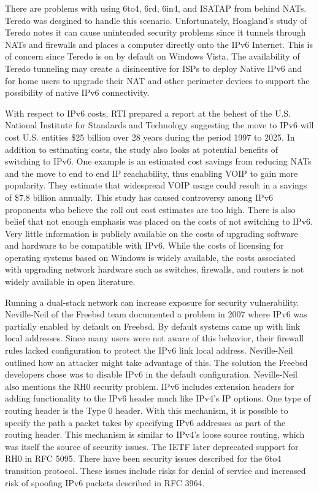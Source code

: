 There are problems with using 6to4, 6rd, 6in4, and ISATAP from behind
NATs.  Teredo was desgined to handle this scenario.  Unfortunately,
Hoagland's study of Teredo notes it can cause unintended security
problems since it tunnels through NATs and firewalls and places
a computer directly onto the IPv6 Internet.  This is of concern
since Teredo is on by default on Windows Vista.
The availability of Teredo tunneling may
create a disincentive for ISPs to deploy Native IPv6 and for home
users to upgrade their NAT and other perimeter devices to support
the possibility of native IPv6 connectivity.

With respect to IPv6 costs, RTI prepared a report at the behest of
the U.S. National Institute for Standards and Technology suggesting
the move to IPv6 will cost U.S. entities \$25 billion over 28
years during the period 1997 to 2025\cite{RTI01}.  In addition
to estimating costs, the study also looks at potential benefits
of switching to IPv6.  One example is an estimated cost savings
from reducing NATs and the move to end to end IP reachability,
thus enabling VOIP to gain more popularity.  They estimate that
widespread VOIP usage could result in a savings of \$7.8 billion
annually.  This study has caused controversy among IPv6 proponents
who believe the roll out cost estimates are too high.
There is also belief that not enough emphasis was placed on the
costs of not switching to IPv6.  Very little information is publicly
available on the costs of upgrading software and hardware to be
compatible with IPv6.  While the costs of licensing for operating
systems based on Windows is widely available, the costs associated
with upgrading network hardware such as switches, firewalls, and
routers is not widely available in open literature.

Running a dual-stack network can increase exposure for security
vulnerability.  Neville-Neil of the Freebsd team documented a problem
in 2007 where IPv6 was partially enabled by default on Freebsd.
By default systems came up with link local addresses.  Since many
users were not aware of this behavior, their firewall rules lacked
configuration to protect the IPv6 link local address\cite{Freebsd01}.
Neville-Neil outlined how an attacker might take advantage of this.
The solution the Freebsd developers chose was to disable IPv6
in the default configuration.  Neville-Neil also mentions the
RH0 security problem.  IPv6 includes extension headers for adding
functionality to the IPv6 header much like IPv4's IP options.  One
type of routing header is the Type 0 header.  With this mechanism,
it is possible to specify the path a packet takes by specifying
IPv6 addresses as part of the routing header.  This mechanism is
similar to IPv4's loose source routing, which was itself the source
of security issues\cite{RH01}.  The IETF later deprecated support
for RH0 in RFC 5095.  There have been security issues described for
the 6to4 transition protocol.  These issues include risks for denial
of service and increased risk of spoofing IPv6 packets described
in RFC 3964.

